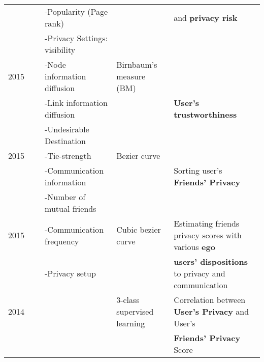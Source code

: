 \begin{longtable}{lllll}
	\     & \                                              & -Popularity (Page rank)          &                                  & and \textbf{privacy risk}                                     \\
	\     & \                                              & -Privacy Settings: visibility    &                                  &                                                               \\\hline
	2015  & \cite{yongbozeng_study_2015}                   & -Node information diffusion      & Birnbaum's measure (BM)          &                                                               \\
	\     & \                                              & -Link information diffusion      &                                  & \textbf{User’s trustworthiness}                               \\
	\     & \                                              & -Undesirable Destination         &                                  &                                                               \\\hline
	2015  & \cite{b.s._privacy_2015}                       & -Tie-strength                    & Bezier curve                     &                                                               \\
	\     & \                                              & -Communication information       &                                  & Sorting user's \textbf{Friends’ Privacy}                      \\
	\     & \                                              & -Number of mutual friends        &                                  &                                                               \\\hline
	2015  & \cite{vidyalakshmi_privacy_2015}               & -Communication frequency         & Cubic bezier curve               & Estimating friends privacy scores with various \textbf{ego}   \\
	\     &                                                & -Privacy setup                   &                                  & \textbf{users’ dispositions} to privacy and communication     \\\hline
	2014  & \cite{caliskanislam_privacy_2014}              &                                  & 3-class supervised learning      & Correlation between \textbf{User’s Privacy} and User’s        \\
	\     &                                                &                                  &                                  & \textbf{Friends’ Privacy} Score                               \\\hline

\end{longtable}
